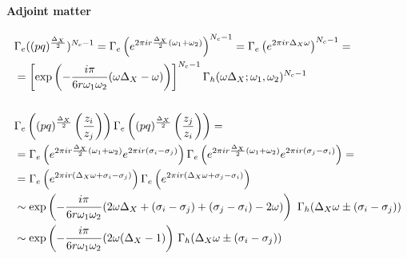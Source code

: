 \begin{appendices}
\paragraph{Adjoint matter}
\begin{equation}
\begin{aligned}
& \Gamma_e((pq)^{\frac{\Delta_X}{2}})^{N_c -1} =
\Gamma_e \left( e^{2 \pi i r  {\Delta_X \over 2} (\omega_1 + \omega_2)}\right)^{N_c-1} =  \Gamma_e \left( e^{2 \pi i r  \Delta_X \omega }\right)^{N_c-1} = \\
&= \left[ \exp \left( - \frac{i \pi} {6 r \omega_1 \omega_2 }  ( \omega \Delta_X - \omega) \right) \right]^{N_c-1} \Gamma_h ( \omega \Delta_X ; \omega_1, \omega_2)^{N_c-1}
\\
\\ 
& \Gamma_e\left( (pq)^{\frac{\Delta_X}{2}} \left( { z_i \over z_j} \right) \right) \Gamma_e \left( (pq)^{\frac{\Delta_X}{2}} \left( { z_j \over z_i} \right) \right) = \\
&= \Gamma_e \left( e^{2 \pi i r \frac{\Delta_X}{2} (\omega_1 + \omega_2)} e^{ 2 \pi  i r (\sigma_i - \sigma_j) } \right)  \Gamma_e \left( e^{ 2 \pi i r \frac{\Delta_X}{2} (\omega_1 + \omega_2)}  e^{ 2 \pi i r (\sigma_j - \sigma_i)} \right) =  \\
&= \Gamma_e \left( e^{2 \pi  i r (\Delta_X \omega +\sigma_i - \sigma_j) } \right) \Gamma_e \left(  e^{2 \pi  i r (\Delta_X \omega +\sigma_j - \sigma_i )} \right) \\
 & \sim   \exp \left(  {- \frac{i \pi} {6 r \omega_1 \omega_2 }  ( 2 \omega \Delta_X + (\sigma_i - \sigma_j)+(\sigma_j - \sigma_i) - 2 \omega) }\right)\, \, \Gamma_h ( \Delta_X \omega \pm( \sigma_i - \sigma_j )) 
 	\\
 & \sim  \exp\left(- \frac{i \pi} {6 r \omega_1 \omega_2 }  ( 2 \omega (\Delta_X - 1) \right)  \, 
  \Gamma_h ( \Delta_X \omega \pm( \sigma_i - \sigma_j ))%
\end{aligned}
\end{equation}


\end{appendices}
